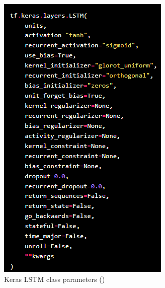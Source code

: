 \begin{figure}
    \begin{center}
        \includegraphics[scale=1]{Images/keras-lstm-parameters.png}
        \caption{Keras LSTM class parameters (\cite{teamKerasDocumentationLSTM})}
        \label{fig:keras-LSTM-parameters}
    \end{center}
\end{figure}



